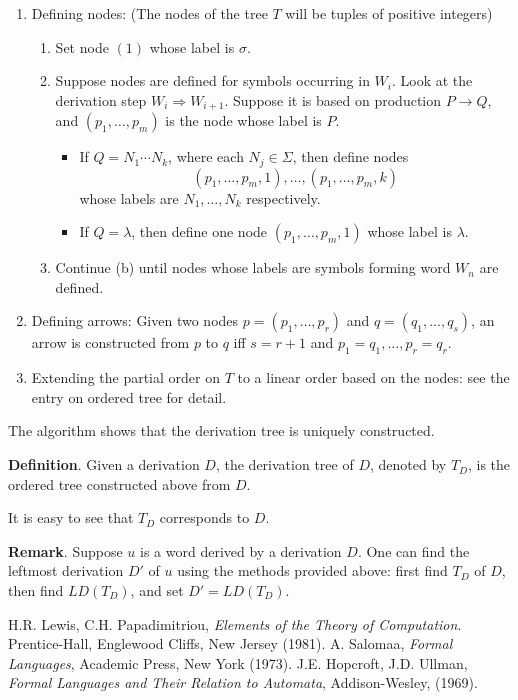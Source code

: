 \documentclass[12pt]{article}
\begin{document}
\begin{enumerate}
\item Defining nodes: (The nodes of the tree $T$ will be tuples of positive integers)
\begin{enumerate}
\item Set node $(1)$ whose label is $\sigma$.
\item Suppose nodes are defined for symbols occurring in $W_i$.  Look at the derivation step $W_i \Rightarrow W_{i+1}$.  Suppose it is based on production $P\to Q$, and $(p_1, \ldots, p_m)$ is the node whose label is $P$.
\begin{itemize}
\item If $Q=N_1 \cdots N_k$, where each $N_j\in \Sigma$, then define nodes $$(p_1, \ldots, p_m,1),\ldots, (p_1, \ldots, p_m,k)$$ whose labels are $N_1, \ldots, N_k$ respectively.
\item If $Q=\lambda$, then define one node $(p_1, \ldots, p_m,1)$ whose label is $\lambda$.
\end{itemize}
\item Continue (b) until nodes whose labels are symbols forming word $W_n$ are defined.
\end{enumerate}
\item Defining arrows: Given two nodes $p=(p_1,\ldots,p_r)$ and $q=(q_1,\ldots, q_s)$, an arrow is constructed from $p$ to $q$ iff $s=r+1$ and $p_1=q_1,\ldots, p_r=q_r$.
\item Extending the partial order on $T$ to a linear order based on the nodes: see the entry on ordered tree for detail.
\end{enumerate}

The algorithm shows that the derivation tree is uniquely constructed.

\textbf{Definition}.  Given a derivation $D$, the derivation tree of $D$, denoted by $T_D$, is the ordered tree constructed above from $D$.

It is easy to see that $T_D$ corresponds to $D$.

\textbf{Remark}.  Suppose $u$ is a word derived by a derivation $D$.  One can find the leftmost derivation $D'$ of $u$ using the methods provided above: first find $T_D$ of $D$, then find $LD(T_D)$, and set $D'=LD(T_D)$.

\begin{thebibliography}{9}
 H.R. Lewis, C.H. Papadimitriou, {\em Elements of the Theory of Computation}. Prentice-Hall, Englewood Cliffs, New Jersey (1981).
 A. Salomaa, {\em Formal Languages}, Academic Press, New York (1973).
 J.E. Hopcroft, J.D. Ullman, {\em Formal Languages and Their Relation to Automata}, Addison-Wesley, (1969).
\end{thebibliography}
\end{document}
